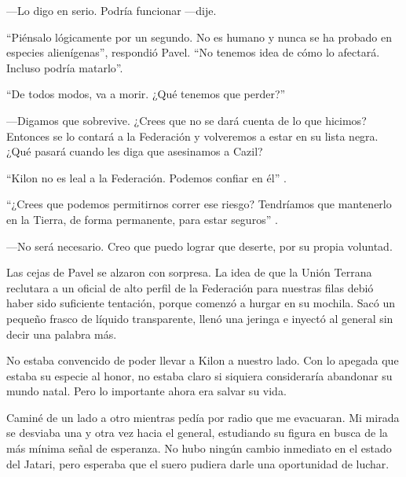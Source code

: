 —Lo digo en serio. Podría funcionar —dije.

``Piénsalo lógicamente por un segundo. No es humano y nunca se ha probado en especies alienígenas'', respondió Pavel. ``No tenemos idea de cómo lo afectará. Incluso podría matarlo''.

``De todos modos, va a morir. ¿Qué tenemos que perder?''


—Digamos que sobrevive. ¿Crees que no se dará cuenta de lo que hicimos? Entonces se lo contará a la Federación y volveremos a estar en su lista negra. ¿Qué pasará cuando les diga que asesinamos a Cazil?

``Kilon no es leal a la Federación. Podemos confiar en él''
.

``¿Crees que podemos permitirnos correr ese riesgo? Tendríamos que mantenerlo en la Tierra, de forma permanente, para estar seguros''
.

—No será necesario. Creo que puedo lograr que deserte, por su propia voluntad.

Las cejas de Pavel se alzaron con sorpresa. La idea de que la Unión Terrana reclutara a un oficial de alto perfil de la Federación para nuestras filas debió haber sido suficiente tentación, porque comenzó a hurgar en su mochila. Sacó un pequeño frasco de líquido transparente, llenó una jeringa e inyectó al general sin decir una palabra más.

No estaba convencido de poder llevar a Kilon a nuestro lado. Con lo apegada que estaba su especie al honor, no estaba claro si siquiera consideraría abandonar su mundo natal. Pero lo importante ahora era salvar su vida.

Caminé de un lado a otro mientras pedía por radio que me evacuaran. Mi mirada se desviaba una y otra vez hacia el general, estudiando su figura en busca de la más mínima señal de esperanza. No hubo ningún cambio inmediato en el estado del Jatari, pero esperaba que el suero pudiera darle una oportunidad de luchar.
